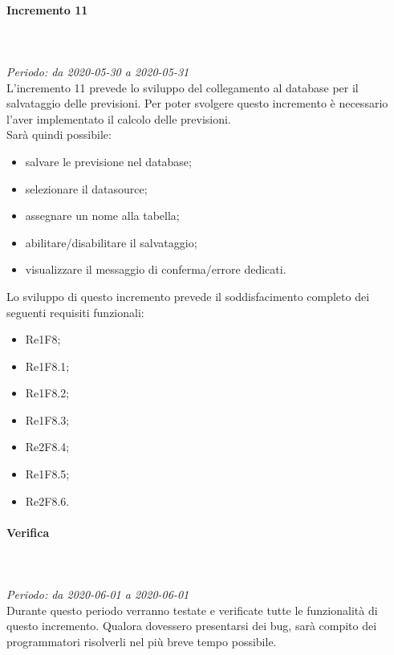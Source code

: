 \paragraph{Incremento 11}\mbox{} \\ \mbox{} \\ 
\textit{Periodo: da 2020-05-30 a 2020-05-31}\\
L’incremento 11 prevede lo sviluppo del collegamento al database per il salvataggio delle previsioni. Per poter svolgere questo incremento è necessario l'aver implementato il calcolo delle previsioni. \\
Sarà quindi possibile:
\begin{itemize}
	\item salvare le previsione nel database;
	\item selezionare il datasource;
	\item assegnare un nome alla tabella;
	\item abilitare/disabilitare il salvataggio;
	\item visualizzare il messaggio di conferma/errore dedicati.
\end{itemize}
Lo sviluppo di questo incremento prevede il soddisfacimento completo dei seguenti requisiti funzionali:
\begin{itemize}
\item Re1F8;
\item Re1F8.1;
\item Re1F8.2;
\item Re1F8.3;
\item Re2F8.4;
\item Re1F8.5;
\item Re2F8.6.
\end{itemize}
\paragraph*{Verifica}\mbox{} \\ \mbox{} \\ 
\textit{Periodo: da 2020-06-01 a 2020-06-01}\\
Durante questo periodo verranno testate e verificate tutte le funzionalità di questo incremento. Qualora dovessero presentarsi dei bug, sarà compito dei programmatori risolverli nel più breve tempo possibile.

